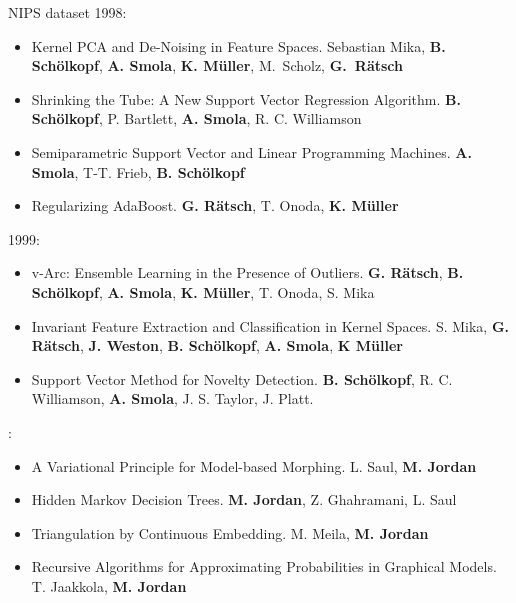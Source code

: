 \documentclass[10pt, mathserif]{beamer} %
\theoremstyle{definition}
\theoremstyle{plain}
\begin{document}
\begin{frame}[label=NIPS]{NIPS dataset}
\tiny
1998:

\begin{itemize}
\item {\color{red} Kernel} PCA and De-Noising in Feature Spaces. Sebastian Mika, {\bf B. Sch\"{o}lkopf}, {\bf A. Smola}, {\bf K. M\"{u}ller}, M.\ Scholz, {\bf G.\ R\"{a}tsch}
\item  Shrinking the Tube: A New {\color{red} Support Vector Regression Algorithm}. {\bf B. Sch\"{o}lkopf}, P. Bartlett, {\bf A. Smola}, R. C. Williamson
\item Semiparametric {\color{red} Support Vector} and Linear Programming Machines. {\bf A. Smola}, T-T. Frieb, {\bf B. Sch\"{o}lkopf}
\item Regularizing AdaBoost. {\bf G. R\"{a}tsch}, T. Onoda, {\bf K. M\"{u}ller}
\end{itemize}

\bigskip

1999:
\begin{itemize}
\item v-Arc: Ensemble Learning in the Presence of Outliers. {\bf G. R\"{a}tsch}, {\bf B. Sch\"{o}lkopf}, {\bf A. Smola}, {\bf K. M\"{u}ller}, T. Onoda, S. Mika
\item Invariant Feature Extraction and Classification in Kernel Spaces. S. Mika, {\bf G. R\"{a}tsch}, {\bf J. Weston}, {\bf B. Sch\"{o}lkopf}, {\bf A. Smola}, {\bf K M\"{u}ller}
\item {\color{red} Support Vector Method} for Novelty Detection. {\bf B. Sch\"{o}lkopf}, R. C. Williamson, {\bf A. Smola}, J. S. Taylor, J. Platt.
\end{itemize}

:
\begin{itemize}
\item A Variational Principle for {\color{blue}Model}-based Morphing. L. Saul, {\bf M. Jordan}
\item Hidden Markov Decision Trees. {\bf M. Jordan}, Z. Ghahramani, L. Saul
\item Triangulation by Continuous Embedding. M. Meila, {\bf M. Jordan}
\item Recursive Algorithms for Approximating Probabilities in Graphical {\color{blue}Models}. T. Jaakkola, {\bf M. Jordan}
\end{itemize}


{\hfill \hyperlink{result}{}}
\end{frame}
\end{document}
